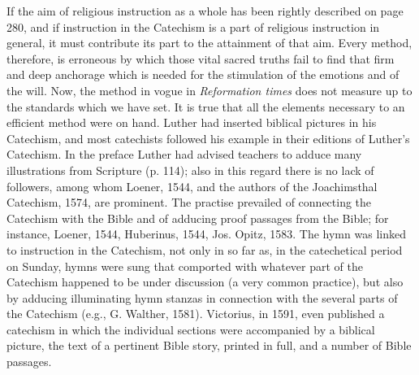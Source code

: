 If the aim of religious instruction as a whole has been rightly described on page 280, and if instruction in the Catechism is a part of religious instruction in general, it must contribute its part to the attainment of that aim. Every
method, therefore, is erroneous by which those vital sacred truths fail to find that firm and deep anchorage which is needed for the stimulation of the emotions and of the will. Now, the method in vogue in \emph{Reformation times} does not measure up to the standards which we have set. It is true that all the elements necessary to an efficient method were on hand. Luther had inserted biblical pictures in his Catechism, and most catechists followed his example in their editions of Luther’s Catechism. In the preface Luther had advised teachers to adduce many illustrations from Scripture (p. 114); also in this regard there is no lack of followers, among whom Loener, 1544, and the authors of the Joachimsthal Catechism, 1574, are prominent. The practise prevailed of connecting the Catechism with the Bible and of adducing proof passages from the Bible; for instance, Loener, 1544, Huberinus, 1544, Jos. Opitz, 1583. The hymn was linked to instruction in the Catechism, not only in so far as, in the catechetical period on Sunday, hymns were sung that comported with whatever part of the Catechism happened to be under discussion (a very common practice), but also by adducing illuminating hymn stanzas in connection with the several parts of the Catechism (e.g., G. Walther, 1581). Victorius, in 1591, even published a catechism in which the individual sections were accompanied by a biblical picture, the text of a pertinent Bible story, printed in full, and a number of Bible passages.

